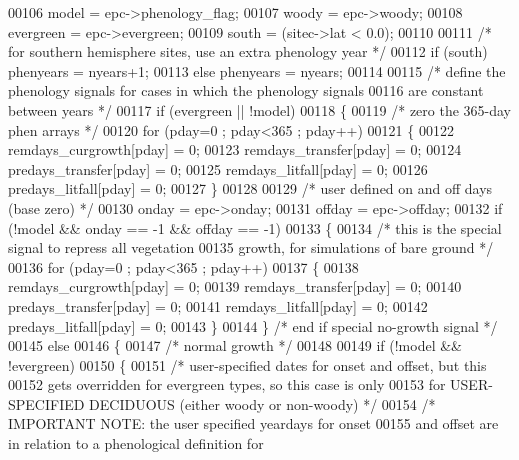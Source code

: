 \begin{DoxyCode}
00106     model = epc->phenology\_flag;
00107     woody = epc->woody;
00108     evergreen = epc->evergreen;
00109     south = (sitec->lat < 0.0);
00110         
00111     \textcolor{comment}{/* for southern hemisphere sites, use an extra phenology year */}
00112     \textcolor{keywordflow}{if} (south) phenyears = nyears+1;
00113     \textcolor{keywordflow}{else} phenyears = nyears;
00114     
00115     \textcolor{comment}{/* define the phenology signals for cases in which the phenology signals}
00116 \textcolor{comment}{    are constant between years */}
00117     \textcolor{keywordflow}{if} (evergreen || !model)
00118     \{
00119         \textcolor{comment}{/* zero the 365-day phen arrays */}
00120         \textcolor{keywordflow}{for} (pday=0 ; pday<365 ; pday++)
00121         \{
00122             remdays\_curgrowth[pday] = 0;
00123             remdays\_transfer[pday] = 0;
00124             predays\_transfer[pday] = 0;
00125             remdays\_litfall[pday] = 0;
00126             predays\_litfall[pday] = 0;
00127         \}
00128         
00129         \textcolor{comment}{/* user defined on and off days (base zero) */}
00130         onday = epc->onday;
00131         offday = epc->offday;
00132         \textcolor{keywordflow}{if} (!model && onday == -1 && offday == -1)
00133         \{
00134             \textcolor{comment}{/* this is the special signal to repress all vegetation}
00135 \textcolor{comment}{            growth, for simulations of bare ground */}
00136             \textcolor{keywordflow}{for} (pday=0 ; pday<365 ; pday++)
00137             \{
00138                 remdays\_curgrowth[pday] = 0;
00139                 remdays\_transfer[pday] = 0;
00140                 predays\_transfer[pday] = 0;
00141                 remdays\_litfall[pday] = 0;
00142                 predays\_litfall[pday] = 0;
00143             \}
00144         \} \textcolor{comment}{/* end if special no-growth signal */}
00145         \textcolor{keywordflow}{else}
00146         \{
00147             \textcolor{comment}{/* normal growth */}
00148 
00149             \textcolor{keywordflow}{if} (!model && !evergreen)
00150             \{
00151                 \textcolor{comment}{/* user-specified dates for onset and offset, but this}
00152 \textcolor{comment}{                gets overridden for evergreen types, so this case is only}
00153 \textcolor{comment}{                for USER-SPECIFIED DECIDUOUS (either woody or non-woody) */}
00154                 \textcolor{comment}{/* IMPORTANT NOTE:  the user specified yeardays for onset}
00155 \textcolor{comment}{                and offset are in relation to a phenological definition for}

\end{DoxyCode}
